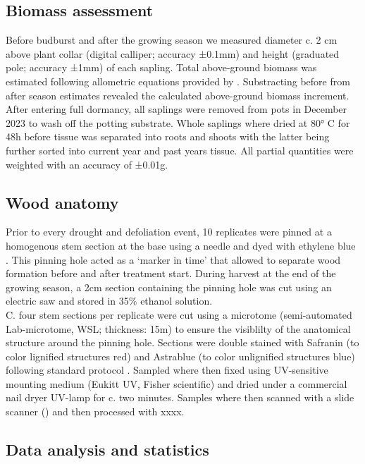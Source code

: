 \documentclass{article}
\begin{document}
	\subsection*{Biomass assessment}
	Before budburst and after the growing season we measured diameter c. 2 cm above plant collar (digital calliper; accuracy ±0.1mm) and height (graduated pole; accuracy ±1mm) of each sapling. Total above-ground biomass was estimated following allometric equations provided by \citet{annighoferSpeciesspecificGenericBiomass2016}. Substracting before from after season estimates revealed the calculated above-ground biomass increment.	\\
After entering full dormancy, all saplings were removed from pots in December 2023 to wash off the potting substrate. Whole saplings where dried at 80° C for 48h before tissue was separated into roots and shoots with the latter being further sorted into current year and past years tissue. All partial quantities were weighted with an accuracy of ±0.01g.\\

	\subsection*{Wood anatomy}
Prior to every drought and defoliation event, 10 replicates were pinned at a homogenous stem section at the base using a needle and dyed with ethylene blue \citep{gartnerCambialActivityMoringa2021a}. This pinning hole acted as a `marker in time' that allowed to separate wood formation before and after treatment start. During harvest at the end of the growing season, a 2cm section containing the pinning hole was cut using an electric saw and stored in 35\% ethanol solution. \\
C. four stem sections per replicate were cut using a microtome (semi-automated Lab-microtome, WSL; thickness: 15\textmu m) to ensure the visiblilty of the anatomical structure around the pinning hole. Sections were double stained with Safranin (to color lignified structures red) and Astrablue (to color unlignified structures blue) following standard protocol \citep{gartnerMicroscopicPreparationTechniques2013}. Sampled where then fixed using UV-sensitive mounting medium (Eukitt UV, Fisher scientific) and dried under a commercial nail dryer UV-lamp for c. two minutes. Samples where then scanned with a slide scanner () and then processed with xxxx.

	\subsection*{Data analysis and statistics}
	
\end{document}
